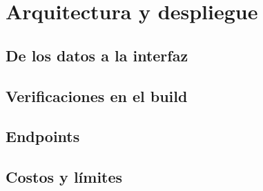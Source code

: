 \section{Arquitectura y despliegue}\label{sec:arquitectura}

\subsection{De los datos a la interfaz}

\subsection{Verificaciones en el build}

\subsection{Endpoints}

\subsection{Costos y límites}
